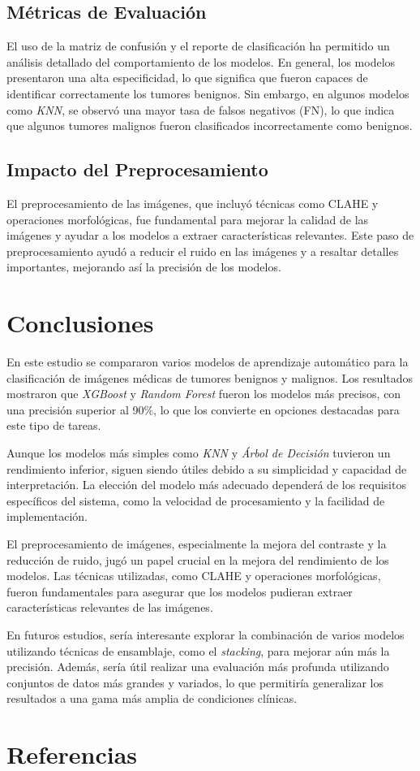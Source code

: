 \documentclass[12pt]{article}
\begin{document}
\subsection{Métricas de Evaluación}
El uso de la matriz de confusión y el reporte de clasificación ha permitido un análisis detallado del comportamiento de los modelos. En general, los modelos presentaron una alta especificidad, lo que significa que fueron capaces de identificar correctamente los tumores benignos. Sin embargo, en algunos modelos como \textit{KNN}, se observó una mayor tasa de falsos negativos (FN), lo que indica que algunos tumores malignos fueron clasificados incorrectamente como benignos.

\subsection{Impacto del Preprocesamiento}
El preprocesamiento de las imágenes, que incluyó técnicas como CLAHE y operaciones morfológicas, fue fundamental para mejorar la calidad de las imágenes y ayudar a los modelos a extraer características relevantes. Este paso de preprocesamiento ayudó a reducir el ruido en las imágenes y a resaltar detalles importantes, mejorando así la precisión de los modelos.


\section{Conclusiones}
En este estudio se compararon varios modelos de aprendizaje automático para la clasificación de imágenes médicas de tumores benignos y malignos. Los resultados mostraron que \textit{XGBoost} y \textit{Random Forest} fueron los modelos más precisos, con una precisión superior al 90\%, lo que los convierte en opciones destacadas para este tipo de tareas.

Aunque los modelos más simples como \textit{KNN} y \textit{Árbol de Decisión} tuvieron un rendimiento inferior, siguen siendo útiles debido a su simplicidad y capacidad de interpretación. La elección del modelo más adecuado dependerá de los requisitos específicos del sistema, como la velocidad de procesamiento y la facilidad de implementación.

El preprocesamiento de imágenes, especialmente la mejora del contraste y la reducción de ruido, jugó un papel crucial en la mejora del rendimiento de los modelos. Las técnicas utilizadas, como CLAHE y operaciones morfológicas, fueron fundamentales para asegurar que los modelos pudieran extraer características relevantes de las imágenes.

En futuros estudios, sería interesante explorar la combinación de varios modelos utilizando técnicas de ensamblaje, como el \textit{stacking}, para mejorar aún más la precisión. Además, sería útil realizar una evaluación más profunda utilizando conjuntos de datos más grandes y variados, lo que permitiría generalizar los resultados a una gama más amplia de condiciones clínicas.

\section{Referencias}


\end{document}

